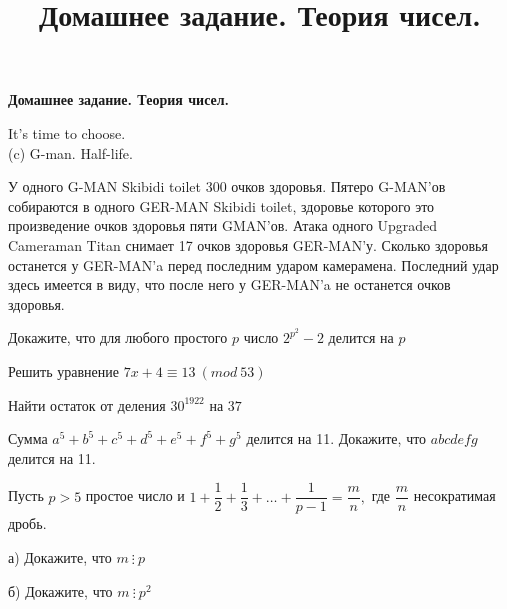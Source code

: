 \centerline{\bf \Huge Домашнее задание. Теория чисел.}
\title{ Домашнее задание. Теория чисел.}

\begin{flushright}
        \scriptsize{It's time to choose. \\ (c) G-man. Half-life.}
\end{flushright}

У одного G-MAN Skibidi toilet 300 очков здоровья. Пятеро G-MAN'ов собираются в одного GER-MAN Skibidi toilet, здоровье которого это произведение очков здоровья пяти GMAN'ов. Атака одного Upgraded Cameraman Titan снимает 17 очков здоровья GER-MAN'у. Сколько здоровья останется у GER-MAN'a перед последним ударом камерамена. Последний удар здесь имеется в виду, что после него у GER-MAN'a не останется очков здоровья.

 Докажите, что для любого простого $p$ число $2^{p^2} - 2 $ делится на $p$

 Решить уравнение $7x + 4 \equiv 13 \ (mod \ 53)$

 Найти остаток от деления $30^{1922}$ на $37$

 Сумма $a^5 + b^5 + c^5 + d^5 + e^5 + f^5 + g^5$ делится на 11. Докажите, что $abcdefg$ делится на 11.

 Пусть $p>5$ простое число и $1+\dfrac{1}{2}+\dfrac{1}{3}+\dotsc+\dfrac{1}{p-1}=\dfrac{m}{n},$ где $\dfrac{m}{n}$ несократимая дробь.

а) Докажите, что $m \ \vdots \ p$

б) Докажите, что $m \ \vdots \ p^2$
